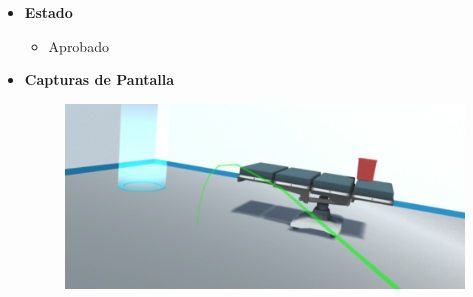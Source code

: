 \begin{itemize}
\begin{itemize}
    \end{itemize}
    \item \textbf{Estado}
    \begin{itemize}
        \item Aprobado
    \end{itemize}
    \item \textbf{Capturas de Pantalla}
    \begin{figure}[H]
       	\begin{center}
       		\includegraphics[width = .7\textwidth]{source/images/image27.png}
       	\end{center} 
    \end{figure}
\end{itemize}

